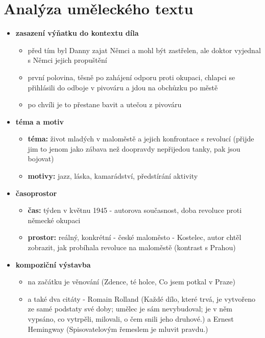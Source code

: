 \documentclass[11pt]{article}
\begin{document}
    \section*{Analýza uměleckého textu}
    \begin{itemize}
        \item\textbf{zasazení výňatku do kontextu díla}
        \begin{itemize}
            \item před tím byl Danny zajat Němci a mohl být zastřelen, ale doktor vyjednal s Němci jejich propuštění
            \item první polovina, těsně po zahájení odporu proti okupaci, chlapci se přihlásili do odboje v pivováru a jdou na obchůzku po městě
            \item po chvíli je to přestane bavit a utečou z pivováru
        \end{itemize}
        \item\textbf{téma a motiv}
        \begin{itemize}
            \item\textbf{téma: }život mladých v maloměstě a jejich konfrontace s revolucí (přijde jim to jenom jako zábava než doopravdy nepřijedou tanky, pak jsou bojovat)
            \item\textbf{motivy: }jazz, láska, kamarádství, předstírání aktivity
        \end{itemize}
        \item\textbf{časoprostor}
        \begin{itemize}
            \item\textbf{čas: }týden v květnu 1945 - autorova současnost, doba revoluce proti německé okupaci
            \item\textbf{prostor: }reálný, konkrétní - české maloměsto - Kostelec, autor chtěl zobrazit, jak probíhala revoluce na maloměstě (kontrast s Prahou)
        \end{itemize}
        \item\textbf{kompoziční výstavba}
        \begin{itemize}
            \item na začátku je věnování (Zdence, té holce, Co jsem potkal v Praze)
            \item a také dva citáty - Romain Rolland (Každé dílo, které trvá, je vytvořeno ze samé podstaty své doby; umělec je sám nevybudoval; je v něm vypsáno, co vytrpěli, milovali, o čem snili jeho druhové.) a Ernest Hemingway (Spisovatelovým řemeslem je mluvit pravdu.)

\end{itemize}
\end{itemize}
\end{document}
